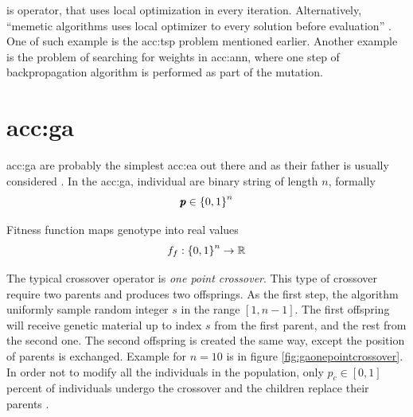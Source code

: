  is operator, that uses local optimization in every iteration. Alternatively, \enquote{memetic algorithms uses local optimizer to every solution before evaluation} \citep{HowToSolveItModernHeuristics}. One of such example is the \acrlong{acc:tsp} problem mentioned earlier. Another example is the problem of searching for weights in \acrshort{acc:ann}, where one step of backpropagation algorithm is performed as part of the mutation.




\section{\texorpdfstring{\acrlong*{acc:ga}}{}}

\acrfull{acc:ga} are probably the simplest \acrfull{acc:ea} out there and as their father is usually considered . In the \acrshort{acc:ga}, individual are binary string of length $n$, formally
$$ \pmb{p} \in \left\{0,1\right\}^{n} $$

Fitness function maps genotype into real values
$$ f_f:\left\{0,1\right\}^{n}\rightarrow\mathbb{R} $$

The typical crossover operator is \emph{one point crossover}. This type of crossover require two parents and produces two offsprings. As the first step, the algorithm uniformly sample random integer $s$ in the range $\left[ 1, n-1 \right]$. The first offspring will receive genetic material up to index $s$ from the first parent, and the rest from the second one. The second offspring is created the same way, except the position of parents is exchanged. Example for $n=10$ is in figure \ref{fig:gaonepointcrossover}. In order not to modify all the individuals in the population, only $p_c\in\left[0,1\right]$ percent of individuals undergo the crossover and the children replace their parents \citep{IntroductionToEA}.

